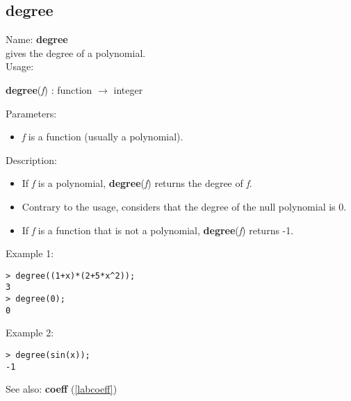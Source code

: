\subsection{degree}
\label{labdegree}
\noindent Name: \textbf{degree}\\
gives the degree of a polynomial.\\
\noindent Usage: 
\begin{center}
\textbf{degree}(\emph{f}) : \textsf{function} $\rightarrow$ \textsf{integer}
\\ 
\end{center}
Parameters: 
\begin{itemize}
\item \emph{f} is a function (usually a polynomial).
\end{itemize}
\noindent Description: \begin{itemize}

\item If \emph{f} is a polynomial, \textbf{degree}(\emph{f}) returns the degree of \emph{f}.

\item Contrary to the usage, \sollya considers that the degree of the null polynomial
   is 0.

\item If \emph{f} is a function that is not a polynomial, \textbf{degree}(\emph{f}) returns -1.
\end{itemize}
\noindent Example 1: 
\begin{center}\begin{minipage}{15cm}\begin{Verbatim}[frame=single]
> degree((1+x)*(2+5*x^2));
3
> degree(0);
0
\end{Verbatim}
\end{minipage}\end{center}
\noindent Example 2: 
\begin{center}\begin{minipage}{15cm}\begin{Verbatim}[frame=single]
> degree(sin(x));
-1
\end{Verbatim}
\end{minipage}\end{center}
See also: \textbf{coeff} (\ref{labcoeff})
